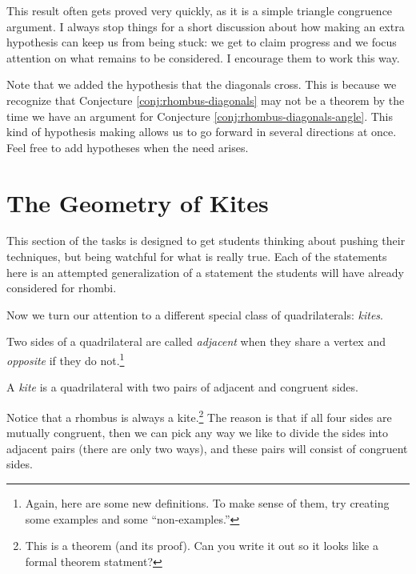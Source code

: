 \begin{annotation}
{
\color{blue}
This result often gets proved very quickly, as it is a simple triangle congruence argument. I always stop things for a short discussion about how making an extra hypothesis can keep us from being stuck: we get to claim progress and we focus attention on what remains to be considered. I encourage them to work this way.
}
\end{annotation}

Note that we added the hypothesis that the diagonals cross.
This is because we recognize that Conjecture \ref{conj:rhombus-diagonals} may not be a theorem by the time we have an argument for Conjecture \ref{conj:rhombus-diagonals-angle}.
This kind of hypothesis making allows us to go forward in several directions at once.
Feel free to add hypotheses when the need arises.


\chapter{The Geometry of Kites}

\begin{annotation}
{
\color{blue}
This section of the tasks is designed to get students thinking about pushing their techniques, but being watchful for what is really true. Each of the statements here is an attempted generalization of a statement the students will have already considered for rhombi. 
}
\end{annotation}

Now we turn our attention to a different special class of quadrilaterals: \emph{kites}.

\begin{definition}\label{defn:quad-sides-type}
Two sides of a quadrilateral are called \emph{adjacent} when they share a vertex and \emph{opposite} if they do not.\footnote{Again, here are some new definitions. To make sense of them, try creating some examples and some ``non-examples.''}

\end{definition}


\begin{definition}\label{defn:kite}
A \emph{kite} is a quadrilateral with two pairs of adjacent and congruent sides.
\end{definition}

Notice that a rhombus is always a kite.\footnote{This is a theorem (and its proof). Can you write it out so it looks like a formal theorem statment?}
The reason is that if all four sides are mutually congruent, then we can pick any way we like to divide the sides into adjacent pairs (there are only two ways), and these pairs will consist of congruent sides.

